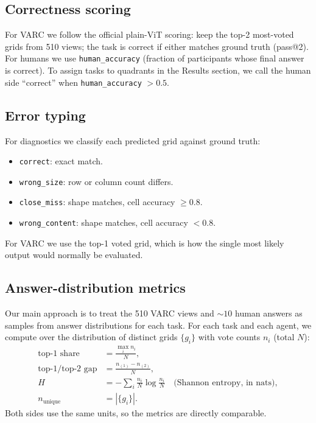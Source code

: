 \documentclass[10pt,letterpaper]{article}
\begin{document}
\subsection{Correctness scoring}

For VARC we follow the official plain-ViT scoring: keep the top-2
most-voted grids from 510 views; the task is correct if either matches
ground truth (pass@2). For humans we use \texttt{human\_accuracy}
(fraction of participants whose final answer is correct). To assign
tasks to quadrants in the Results section, we call the human
side ``correct'' when \texttt{human\_accuracy} $> 0.5$.

\subsection{Error typing}

For diagnostics we classify each predicted grid against ground truth:
\begin{itemize}
  \item \texttt{correct}: exact match.
  \item \texttt{wrong\_size}: row or column count differs.
  \item \texttt{close\_miss}: shape matches, cell accuracy $\geq 0.8$.
  \item \texttt{wrong\_content}: shape matches, cell accuracy $< 0.8$.
\end{itemize}
For VARC we use the top-1 voted grid, which is how the single most
likely output would normally be evaluated.

\subsection{Answer-distribution metrics}

Our main approach is to treat the 510 VARC views and $\sim 10$ human
answers as samples from answer distributions for each task. For each
task and each agent, we compute over the distribution of distinct grids
$\{g_i\}$ with vote counts $n_i$ (total $N$):
\begin{align*}
\text{top-1 share} &= \frac{\max_i n_i}{N},\\
\text{top-1/top-2 gap} &= \frac{n_{(1)} - n_{(2)}}{N},\\
H &= -\sum_i \frac{n_i}{N} \log \frac{n_i}{N}
   \quad\text{(Shannon entropy, in nats)},\\
n_{\mathrm{unique}} &= |\{g_i\}|.
\end{align*}
Both sides use the same units, so the metrics are directly comparable.
\end{document}
